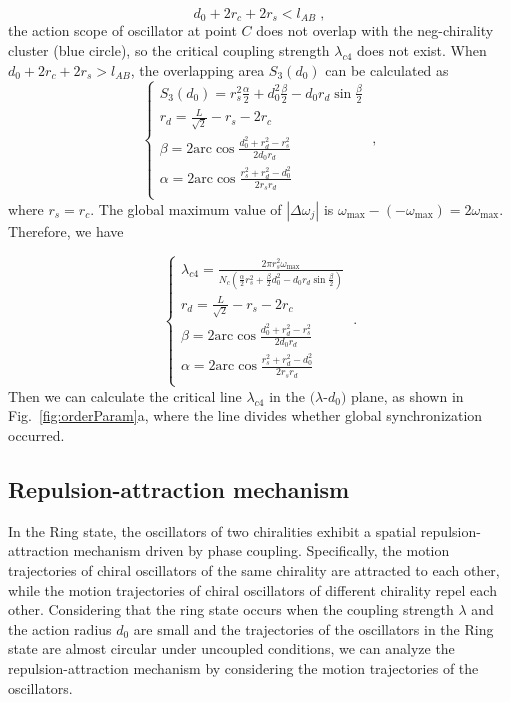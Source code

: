 \documentclass[%
 aip,
 amsmath,amssymb,
 reprint,%
]{revtex4-1}
\begin{document}
\begin{equation}
    d_0+2r_c+2r_s<l_{AB}\;,
\end{equation}
the action scope of oscillator at point $C$ does not overlap with the neg-chirality cluster (blue circle), so the critical coupling strength $\lambda_{c4}$ does not exist. When $d_0+2r_c+2r_s>l_{AB}$, the overlapping area $S_3\left( d_0 \right)$ can be calculated as
\begin{equation}
    \begin{cases}
        S_3\left( d_0 \right) =r_{s}^{2}\frac{\alpha}{2}+d_{0}^{2}\frac{\beta}{2}-d_0r_d\sin \frac{\beta}{2}\\
        r_d=\frac{L}{\sqrt{2}}-r_s-2r_c\\
        \beta =2\mathrm{arc}\cos \frac{d_{0}^{2}+r_{d}^{2}-r_{s}^{2}}{2d_0r_d}\\
        \alpha =2\mathrm{arc}\cos \frac{r_{s}^{2}+r_{d}^{2}-d_{0}^{2}}{2r_sr_d}\\
    \end{cases}\;,
\end{equation}
where $r_s=r_c$. The global maximum value of $\left| \Delta \omega _j \right|$ is $\omega _{\max}-\left( -\omega _{\max} \right) =2\omega _{\max}$. Therefore, we have

\begin{equation}
    \begin{cases}
        \lambda _{c4}=\frac{2\pi r_{s}^{2}\omega _{\max}}{N_c\left( \frac{\alpha}{2}r_{s}^{2}+\frac{\beta}{2}d_{0}^{2}-d_0r_d\sin \frac{\beta}{2} \right)}\\
        r_d=\frac{L}{\sqrt{2}}-r_s-2r_c\\
        \beta =2\mathrm{arc}\cos \frac{d_{0}^{2}+r_{d}^{2}-r_{s}^{2}}{2d_0r_d}\\
        \alpha =2\mathrm{arc}\cos \frac{r_{s}^{2}+r_{d}^{2}-d_{0}^{2}}{2r_sr_d}\\
    \end{cases}\;.
\end{equation}
Then we can calculate the critical line $\lambda_{c4}$ in the $(\lambda$-$d_0)$ plane, as shown in Fig.~\ref{fig:orderParam}a, where the line divides whether global synchronization occurred. 

\subsection{Repulsion-attraction mechanism}

In the Ring state, the oscillators of two chiralities exhibit a spatial repulsion-attraction mechanism driven by phase coupling. Specifically, the motion trajectories of chiral oscillators of the same chirality are attracted to each other, while the motion trajectories of chiral oscillators of different chirality repel each other. Considering that the ring state occurs when the coupling strength $\lambda$ and the action radius $d_0$ are small and the trajectories of the oscillators in the Ring state are almost circular under uncoupled conditions, we can analyze the repulsion-attraction mechanism by considering the motion trajectories of the oscillators.
\end{document}
